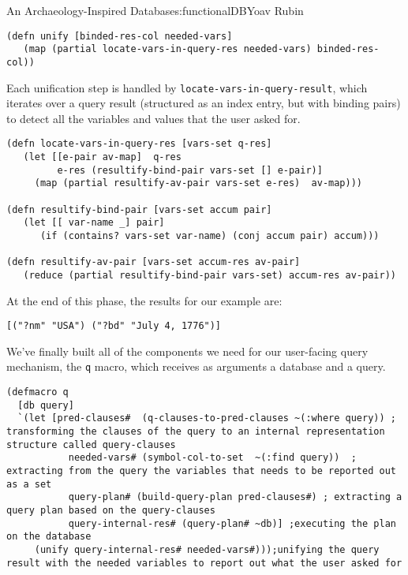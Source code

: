 \begin{aosachapter}{An Archaeology-Inspired Database}{s:functionalDB}{Yoav Rubin}
\begin{verbatim}
(defn unify [binded-res-col needed-vars]
   (map (partial locate-vars-in-query-res needed-vars) binded-res-col))
\end{verbatim}

Each unification step is handled by
\texttt{locate-vars-in-query-result}, which iterates over a query result
(structured as an index entry, but with binding pairs) to detect all the
variables and values that the user asked for.

\begin{verbatim}
(defn locate-vars-in-query-res [vars-set q-res]
   (let [[e-pair av-map]  q-res
         e-res (resultify-bind-pair vars-set [] e-pair)]
     (map (partial resultify-av-pair vars-set e-res)  av-map)))

(defn resultify-bind-pair [vars-set accum pair]
   (let [[ var-name _] pair]
      (if (contains? vars-set var-name) (conj accum pair) accum)))

(defn resultify-av-pair [vars-set accum-res av-pair]
   (reduce (partial resultify-bind-pair vars-set) accum-res av-pair))
\end{verbatim}

At the end of this phase, the results for our example are:

\begin{verbatim}
[("?nm" "USA") ("?bd" "July 4, 1776")]
\end{verbatim}

\label{running-the-show}

We've finally built all of the components we need for our user-facing
query mechanism, the \texttt{q} macro, which receives as arguments a
database and a query.

\begin{verbatim}
(defmacro q
  [db query]
  `(let [pred-clauses#  (q-clauses-to-pred-clauses ~(:where query)) ; transforming the clauses of the query to an internal representation structure called query-clauses
           needed-vars# (symbol-col-to-set  ~(:find query))  ; extracting from the query the variables that needs to be reported out as a set
           query-plan# (build-query-plan pred-clauses#) ; extracting a query plan based on the query-clauses
           query-internal-res# (query-plan# ~db)] ;executing the plan on the database
     (unify query-internal-res# needed-vars#)));unifying the query result with the needed variables to report out what the user asked for
\end{verbatim}


\end{aosachapter}
